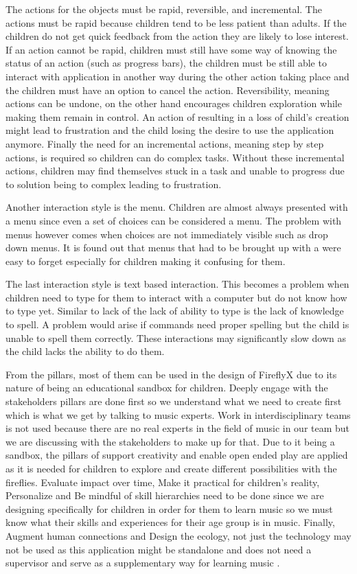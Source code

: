 The actions for the objects must be rapid, reversible, and incremental. The actions must be rapid because children tend to be less patient than adults. If the children do not get quick feedback from the action they are likely to lose interest. If an action cannot be rapid, children must still have some way of knowing the status of an action (such as progress bars), the children must be still able to interact with application in another way during the other action taking place and the children must have an option to cancel the action. Reversibility, meaning actions can be undone, on the other hand encourages children exploration while making them remain in control. An action of resulting in a loss of child's creation might lead to frustration and the child losing the desire to use the application anymore. Finally the need for an incremental actions, meaning step by step actions, is required so children can do complex tasks. Without these incremental actions, children may find themselves stuck in a task and unable to progress due to solution being to complex leading to frustration. 

Another interaction style is the menu. Children are almost always presented with a menu since even a set of choices can be considered a menu. The problem with menus however comes when choices are not immediately visible such as drop down menus. It is found out that menus that had to be brought up with a were easy to forget especially for children making it confusing for them.

The last interaction style is text based interaction. This becomes a problem when children need to type for them to interact with a computer but do not know how to type yet. Similar to lack of the lack of ability to type is the lack of knowledge to spell. A problem would arise if  commands need proper spelling but the child is unable to spell them correctly. These interactions may significantly slow down as the child lacks the ability to do them.

From the pillars, most of them can be used in the design of FireflyX due to its nature of being an educational sandbox for children. Deeply engage with the stakeholders pillars are done first so we understand what we need to create first which is what we get by talking to music experts. Work in interdisciplinary teams is not used because there are no real experts in the field of music in our team but we are discussing with the stakeholders to make up for that. Due to it being a sandbox, the pillars of support creativity and enable open ended play are applied as it is needed for children to explore and create different possibilities with the fireflies. Evaluate impact over time, Make it practical for children’s reality, Personalize and Be mindful of skill hierarchies need to be done since we are designing specifically for children in order for them to learn music so we must know what their skills and experiences for their age group is in music. Finally, Augment human connections and Design the ecology, not just the technology may not be used as this application might be standalone and does not need a supervisor and serve as a supplementary way for learning music .

